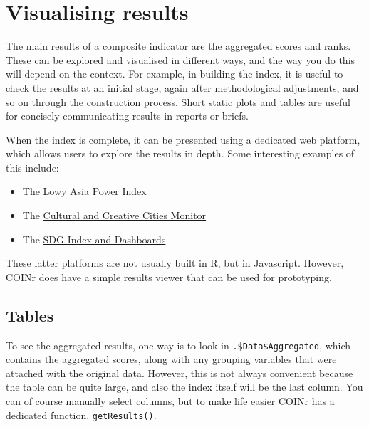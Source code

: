 \documentclass[
]{book}
\providecommand{\tightlist}{%
  \setlength{\itemsep}{0pt}\setlength{\parskip}{0pt}}
\begin{document}
\hypertarget{visualising-results}{%
\chapter{Visualising results}\label{visualising-results}}

The main results of a composite indicator are the aggregated scores and ranks. These can be explored and visualised in different ways, and the way you do this will depend on the context. For example, in building the index, it is useful to check the results at an initial stage, again after methodological adjustments, and so on through the construction process. Short static plots and tables are useful for concisely communicating results in reports or briefs.

When the index is complete, it can be presented using a dedicated web platform, which allows users to explore the results in depth. Some interesting examples of this include:

\begin{itemize}
\tightlist
\item
  The \href{https://power.lowyinstitute.org/}{Lowy Asia Power Index}
\item
  The \href{https://composite-indicators.jrc.ec.europa.eu/cultural-creative-cities-monitor/performance-map}{Cultural and Creative Cities Monitor}
\item
  The \href{https://dashboards.sdgindex.org/map}{SDG Index and Dashboards}
\end{itemize}

These latter platforms are not usually built in R, but in Javascript. However, COINr does have a simple results viewer that can be used for prototyping.

\hypertarget{tables}{%
\section{Tables}\label{tables}}

To see the aggregated results, one way is to look in \texttt{.\$Data\$Aggregated}, which contains the aggregated scores, along with any grouping variables that were attached with the original data. However, this is not always convenient because the table can be quite large, and also the index itself will be the last column. You can of course manually select columns, but to make life easier COINr has a dedicated function, \texttt{getResults()}.
\end{document}
